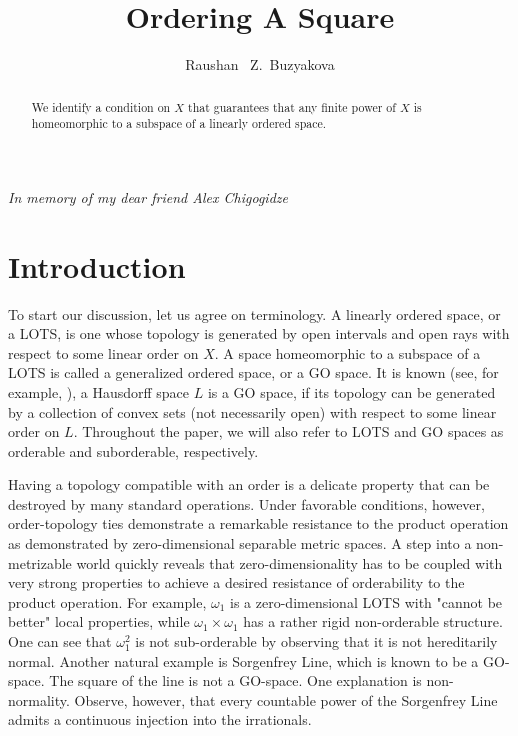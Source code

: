 \documentclass[12pt]{amsart}
\begin{document}
\centerline{\it In memory of my dear friend Alex Chigogidze}

\par\bigskip
\title
{Ordering A Square}
\author{Raushan ~Z.~Buzyakova}

\begin{abstract}{
We identify a condition on $X$ that guarantees that any finite power of $X$ is homeomorphic to a subspace of a linearly ordered space.} 
\end{abstract}

\maketitle
{}
{ }

\section{Introduction}\label{S:intro}
\par\bigskip
To start our discussion, let us agree on terminology. A linearly ordered space, or a LOTS, is one whose topology is generated by open intervals and open rays with respect to some linear order on $X$. A space homeomorphic to a subspace of a LOTS is called a generalized ordered space, or a GO space. It is known (see, for example, \cite{BL}), a Hausdorff space $L$ is a GO space, if  its topology can be generated by a collection of convex sets (not necessarily open) with respect to some linear  order on $L$.  Throughout the paper, we will also refer to LOTS and GO spaces as orderable and suborderable, respectively.

Having a topology compatible with an order is a delicate property that can be destroyed by many standard operations. Under favorable conditions, however,  order-topology ties demonstrate a remarkable resistance to the product operation as demonstrated by zero-dimensional separable metric spaces. A step into a non-metrizable world quickly reveals that zero-dimensionality has to be coupled with very strong properties to achieve a desired resistance of orderability to the product operation. For example, $\omega_1$ is a zero-dimensional LOTS with "cannot be better"  local properties, while $\omega_1\times\omega_1$ has a rather rigid non-orderable structure. One can see that  $\omega_1^2$ is  not sub-orderable by observing that it is not hereditarily normal. Another natural example is Sorgenfrey Line, which is known to be a GO-space. The square of the line is not a GO-space. One explanation is non-normality. Observe, however, that every countable power of the Sorgenfrey Line admits a continuous injection into the irrationals. 
\end{document}
